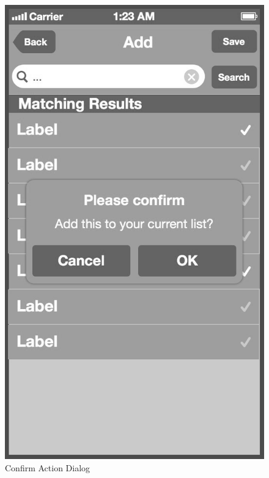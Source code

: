 \begin{figure}[!tb]
    \begin{minipage}[b]{0.45\linewidth}
        \centering
        \includegraphics[width=0.8025\linewidth]{figures/Screen_3a_bw.jpg}
        \caption[Confirm Action Dialog]{Confirm Action Dialog}
        \label{fig:ConfirmDialog}
    \end{minipage}
    \hspace{0.5cm}
    \begin{minipage}[b]{0.45\linewidth}
        \centering

\end{minipage}
\end{figure}

